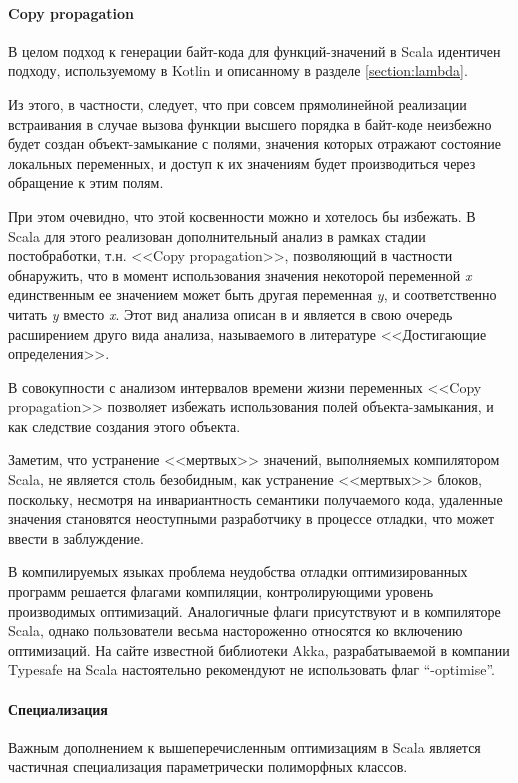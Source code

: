 \paragraph{Copy propagation}
В целом подход к генерации байт-кода для  функций-значений в Scala идентичен подходу,
используемому в Kotlin и описанному в разделе \ref{section:lambda}.

Из этого, в частности, следует, что при совсем прямолинейной реализации встраивания в случае
вызова функции высшего порядка в байт-коде неизбежно будет создан объект-замыкание с полями,
значения которых отражают состояние локальных переменных, и доступ к их значениям будет
производиться через обращение к этим полям.

При этом очевидно, что этой косвенности можно и хотелось бы избежать.
В Scala для этого реализован дополнительный анализ в рамках стадии постобработки,
т.н. <<Copy propagation>>, позволяющий в частности обнаружить, что в момент использования значения
некоторой переменной \textit{x} единственным ее значением может быть другая переменная \textit{y},
и соответственно читать \textit{y} вместо \textit{x}. Этот вид анализа описан в \cite{Muchnick}
и является в свою очередь расширением друго вида анализа, называемого в литературе
<<Достигающие определения>>.

В совокупности с анализом интервалов времени жизни переменных <<Copy propagation>> позволяет
избежать использования полей объекта-замыкания, и как следствие создания этого объекта.

Заметим, что устранение <<мертвых>> значений, выполняемых компилятором Scala, не является столь
безобидным, как устранение <<мертвых>> блоков, поскольку, несмотря на инвариантность семантики
получаемого кода, удаленные значения становятся неоступными разработчику в процессе отладки,
что может ввести в заблуждение.

В компилируемых языках проблема неудобства отладки оптимизированных программ решается флагами
компиляции, контролирующими уровень производимых оптимизаций.
Аналогичные флаги присутствуют и в компиляторе Scala,
однако пользователи весьма настороженно относятся ко включению оптимизаций.
На сайте известной библиотеки Akka, разрабатываемой в компании Typesafe на Scala настоятельно
рекомендуют не использовать флаг ``-optimise''.

\paragraph{Специализация}
Важным дополнением к вышеперечисленным оптимизациям в Scala является частичная специализация
параметрически полиморфных классов.

